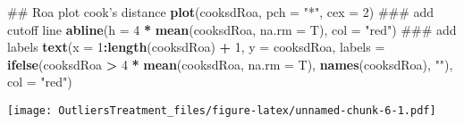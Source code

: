 \documentclass[]{article}
\newenvironment{Shaded}{\begin{snugshade}}{\end{snugshade}}
\newcommand{\KeywordTok}[1]{\textcolor[rgb]{0.13,0.29,0.53}{\textbf{#1}}}
\newcommand{\DataTypeTok}[1]{\textcolor[rgb]{0.13,0.29,0.53}{#1}}
\newcommand{\DecValTok}[1]{\textcolor[rgb]{0.00,0.00,0.81}{#1}}
\newcommand{\StringTok}[1]{\textcolor[rgb]{0.31,0.60,0.02}{#1}}
\newcommand{\OperatorTok}[1]{\textcolor[rgb]{0.81,0.36,0.00}{\textbf{#1}}}
\newcommand{\NormalTok}[1]{#1}
\begin{document}
\begin{Shaded}
\begin{Highlighting}[]
\NormalTok{## Roa plot cook's distance}
\KeywordTok{plot}\NormalTok{(cooksdRoa, }\DataTypeTok{pch =} \StringTok{"*"}\NormalTok{, }\DataTypeTok{cex =} \DecValTok{2}\NormalTok{)}
\NormalTok{### add cutoff line}
\KeywordTok{abline}\NormalTok{(}\DataTypeTok{h =} \DecValTok{4} \OperatorTok{*}\StringTok{ }\KeywordTok{mean}\NormalTok{(cooksdRoa, }\DataTypeTok{na.rm =}\NormalTok{ T), }\DataTypeTok{col =} \StringTok{"red"}\NormalTok{)}
\NormalTok{### add labels}
\KeywordTok{text}\NormalTok{(}\DataTypeTok{x =} \DecValTok{1}\OperatorTok{:}\KeywordTok{length}\NormalTok{(cooksdRoa) }\OperatorTok{+}\StringTok{ }\DecValTok{1}\NormalTok{, }\DataTypeTok{y =}\NormalTok{ cooksdRoa, }\DataTypeTok{labels =} \KeywordTok{ifelse}\NormalTok{(cooksdRoa }\OperatorTok{>}\StringTok{ }
\StringTok{    }\DecValTok{4} \OperatorTok{*}\StringTok{ }\KeywordTok{mean}\NormalTok{(cooksdRoa, }\DataTypeTok{na.rm =}\NormalTok{ T), }\KeywordTok{names}\NormalTok{(cooksdRoa), }\StringTok{""}\NormalTok{), }
    \DataTypeTok{col =} \StringTok{"red"}\NormalTok{)}
\end{Highlighting}
\end{Shaded}

\texttt{[image: OutliersTreatment\_files/figure-latex/unnamed-chunk-6-1.pdf]}
\end{document}
